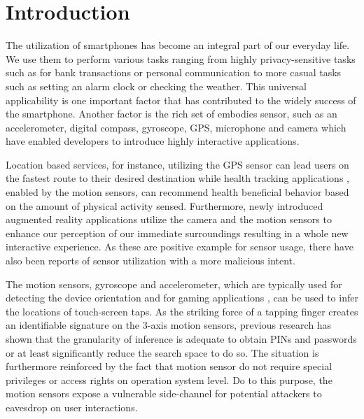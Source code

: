 \chapter{Introduction\label{cha:chapter1}}
The utilization of smartphones has become an integral part of our everyday life. We use them to perform various tasks ranging from highly privacy-sensitive tasks such as for bank transactions or personal communication to more casual tasks such as setting an alarm clock or checking the weather. This universal applicability is one important factor that has contributed to the widely success of the smartphone. Another factor is the rich set of embodies sensor, such as an accelerometer, digital compass, gyroscope, GPS, microphone and camera \cite{5560598} which have enabled developers to introduce highly interactive applications.



Location based services, for instance, utilizing the GPS sensor \cite{link2011footpath} can lead users on the fastest route to their desired destination while health tracking applications \cite{case2015accuracy}, enabled by the motion sensors, can recommend health beneficial behavior based on the amount of physical activity sensed. Furthermore, newly introduced augmented reality applications utilize the camera and the motion sensors to enhance our perception of our immediate surroundings resulting in a whole new interactive experience. As these are positive example for sensor usage, there have also been reports of sensor utilization with a more malicious intent.

The motion sensors, gyroscope and accelerometer, which are typically used for detecting the device orientation and for gaming applications \cite{feijoo2012mobile}, can be used to infer the locations of touch-screen taps. As the striking force of a tapping finger creates an identifiable signature on the 3-axis motion sensors, previous research has shown that the granularity of inference is adequate to obtain PINs and passwords \cite{Touchlogger, Tapprints, Accessory} or at least significantly reduce the search space to do so. The situation is furthermore reinforced by the fact that motion sensor do not require special privileges or access rights on operation system level. Do to this purpose, the motion sensors expose a vulnerable side-channel for potential attackers to eavesdrop on user interactions.

